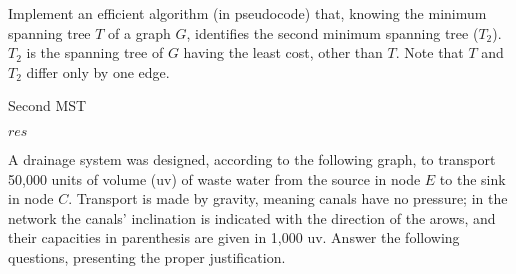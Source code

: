 \documentclass{cal}
\begin{document}
{
Implement an efficient algorithm (in pseudocode) that, knowing the minimum spanning tree $T$ of a graph $G$, identifies the second minimum spanning tree ($T_2$). $T_2$ is the spanning tree of $G$ having the least cost, other than $T$. Note that $T$ and $T_2$ differ only by one edge.

\ansseparator

\begin{algorithm}[H]
    \caption{Second MST}
    \begin{algorithmic}[1]
                 
                 
                 
                 
                    \EndIf
                \EndFor
            \EndFor
            \State \Return $res$
        \EndFunction
    \end{algorithmic}
\end{algorithm}

A drainage system was designed, according to the following graph, to transport 50,000 units of volume (uv) of waste water from the source in node $E$ to the sink in node $C$. Transport is made by gravity, meaning canals have no pressure; in the network the canals' inclination is indicated with the direction of the arows, and their capacities in parenthesis are given in 1,000 uv. Answer the following questions, presenting the proper justification.

\begin{center}
\end{center}}
\end{document}
